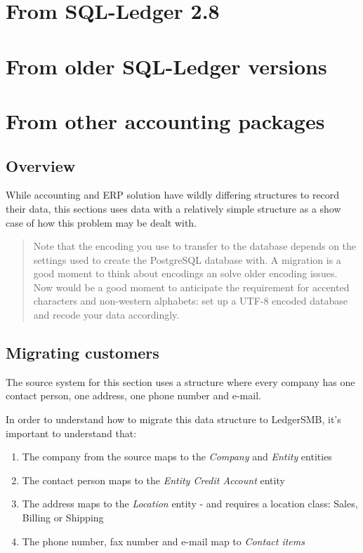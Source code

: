 \section{From SQL-Ledger 2.8}
\label{sec-migration-from-sql-ledger-28}

\section{From older SQL-Ledger versions}
\label{sec-migration-from-older-sql-ledger}

\section{From other accounting packages}
\label{sec-migration-from-other-accounting-systems}

\subsection{Overview}





While accounting and ERP solution have wildly differing structures to record their
data, this sections uses data with a relatively simple structure as a show case of
how this problem may be dealt with.

\begin{quote}
Note that the encoding you use to transfer to the database depends on the settings
used to create the PostgreSQL database with.  A migration is a good moment to think
about encodings an solve older encoding issues.  Now would be a good moment to
anticipate the requirement for accented characters and non-western alphabets: set up
a UTF-8 encoded database and recode your data accordingly.
\end{quote}

\subsection{Migrating customers}
\label{subsec-migration-others-customers}

The source system for this section uses a structure where every company has one
contact person, one address, one phone number and e-mail.

In order to understand how to migrate this data structure to LedgerSMB, it's
important to understand that:

\begin{enumerate}
\item The company from the source maps to the \emph{Company} and \emph{Entity} entities
\item The contact person maps to the \emph{Entity Credit Account} entity
\item The address maps to the \emph{Location} entity - and requires a location class: Sales, Billing or Shipping
\item The phone number, fax number and e-mail map to \emph{Contact items}
\end{enumerate}

